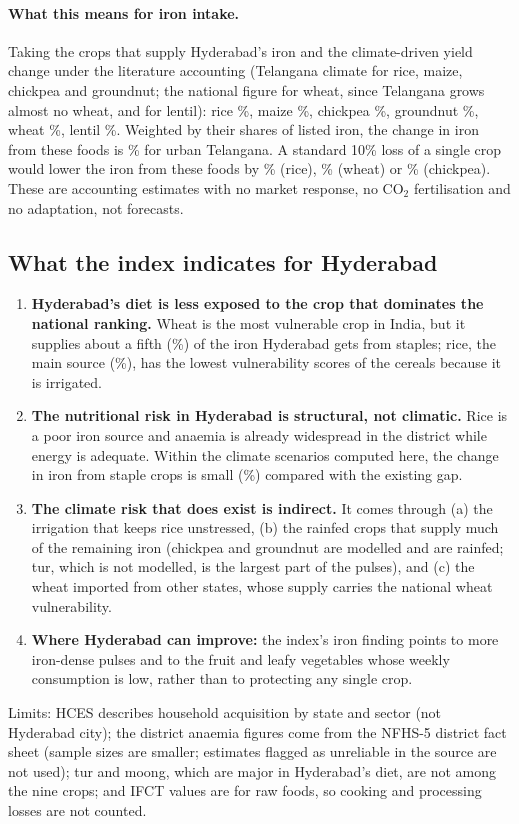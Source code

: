 \paragraph{What this means for iron intake.} Taking the crops that supply Hyderabad's iron and the climate-driven
yield change under the literature accounting (Telangana climate for rice, maize, chickpea and groundnut; the
national figure for wheat, since Telangana grows almost no wheat, and for lentil): rice \hqdYRice\%, maize
\hqdYMaize\%, chickpea \hqdYChickpea\%, groundnut \hqdYGroundnut\%, wheat \hqdYWheat\%, lentil \hqdYLentil\%. Weighted
by their shares of listed iron, the change in iron from these foods is \hqIronChangeUrban\% for urban Telangana.
A standard 10\% loss of a single crop would lower the iron from these foods by \hqIronTenRiceUrban\% (rice),
\hqIronTenWheatUrban\% (wheat) or \hqIronTenChickpeaUrban\% (chickpea). These are accounting estimates with no market
response, no CO$_2$ fertilisation and no adaptation, not forecasts.

\subsection{What the index indicates for Hyderabad}
\begin{enumerate}
\item \textbf{Hyderabad's diet is less exposed to the crop that dominates the national ranking.} Wheat is the
most vulnerable crop in India, but it supplies about a fifth (\hqTgUrbanFeWheat\%) of the iron Hyderabad gets from
staples; rice, the main source (\hqTgUrbanFeRice\%), has the lowest vulnerability scores of the cereals because it
is irrigated.
\item \textbf{The nutritional risk in Hyderabad is structural, not climatic.} Rice is a poor iron source and
anaemia is already widespread in the district while energy is adequate. Within the climate scenarios computed
here, the change in iron from staple crops is small (\hqIronChangeUrban\%) compared with the existing gap.
\item \textbf{The climate risk that does exist is indirect.} It comes through (a) the irrigation that keeps rice
unstressed, (b) the rainfed crops that supply much of the remaining iron (chickpea and groundnut are modelled and are
rainfed; tur, which is not modelled, is the largest part of the pulses), and (c) the wheat imported from other states, whose supply carries
the national wheat vulnerability.
\item \textbf{Where Hyderabad can improve:} the index's iron finding points to more iron-dense pulses
and to the fruit and leafy vegetables whose weekly consumption is low, rather than to protecting any single crop.
\end{enumerate}
Limits: HCES describes household acquisition by state and sector (not Hyderabad city); the district anaemia
figures come from the NFHS-5 district fact sheet (sample sizes are smaller; estimates flagged as unreliable in the
source are not used); tur and moong, which are major in Hyderabad's diet, are not among the nine crops; and
IFCT values are for raw foods, so cooking and processing losses are not counted.
